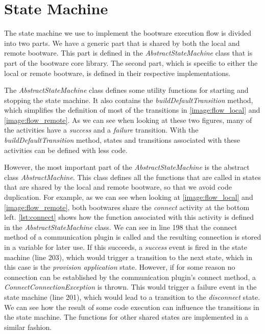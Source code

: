 \section{State Machine}
\label{implementation:statemachine}

The state machine we use to implement the bootware execution flow is divided into two parts.
We have a generic part that is shared by both the local and remote bootware.
This part is defined in the \textit{AbstractStateMachine} class that is part of the bootware core library.
The second part, which is specific to either the local or remote bootware, is defined in their respective implementations.

The \textit{AbstractStateMachine} class defines some utility functions for starting and stopping the state machine.
It also contains the \textit{buildDefaultTransition} method, which simplifies the definition of most of the transitions in \autoref{image:flow_local} and \autoref{image:flow_remote}.
As we can see when looking at these two figures, many of the activities have a \textit{success} and a \textit{failure} transition.
With the \textit{buildDefaultTransition} method, states and transitions associated with these activities can be defined with less code.

However, the most important part of the \textit{AbstractStateMachine} is the abstract class \textit{AbstractMachine}.
This class defines all the functions that are called in states that are shared by the local and remote bootware, so that we avoid code duplication.
For example, as we can see when looking at \autoref{image:flow_local} and \autoref{image:flow_remote}, both bootwares share the \textit{connect} activity at the bottom left.
\autoref{lst:connect} shows how the function associated with this activity is defined in the \textit{AbstractStateMachine} class.
We can see in line 198 that the connect method of a communication plugin is called and the resulting connection is stored in a variable for later use.
If this succeeds, a \textit{success} event is fired in the state machine (line 203), which would trigger a transition to the next state, which in this case is the \textit{provision application} state.
However, if for some reason no connection can be established by the communication plugin's connect method, a \textit{ConnectConnectionException} is thrown.
This would trigger a failure event in the state machine (line 201), which would lead to a transition to the \textit{disconnect} state.
We can see how the result of some code execution can influence the transitions in the state machine.
The functions for other shared states are implemented in a similar fashion.

